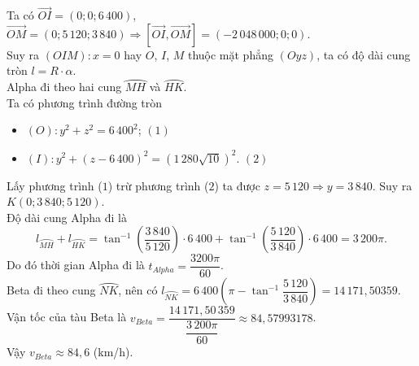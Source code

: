 \begin{ex}
{\begin{center}
\begin{tikzpicture}[>=stealth,line join=round,line cap=round,font=\footnotesize,scale=1]
			\end{tikzpicture}
		\end{center}
		Ta có $\overrightarrow{OI}=(0;0;6\,400)$, $\overrightarrow{OM}=(0;5\,120;3\,840)\Rightarrow \left[\overrightarrow{OI},\overrightarrow{OM}\right]=(-2\,048\,000;0;0)$.\\
		Suy ra $(OIM)\colon x=0$ hay $O$, $I$, $M$ thuộc mặt phẳng $(Oyz)$, ta có độ dài cung tròn $l=R\cdot\alpha $.\\
		Alpha đi theo hai cung $\wideparen{MH}$ và $\wideparen{HK}$. \\
		Ta có phương trình đường tròn 
		\begin{itemize}
			\item $(O)\colon y^2 +z^2 =6\,400^2$; \hfill$(1)$
			\item $(I)\colon y^2 +(z-6\,400)^2 =\left(1\,280\sqrt{10}\right)^2$. \hfill$(2)$
		\end{itemize}
		Lấy phương trình ($1$) trừ phương trình ($2$) ta được $z=5\,120\Rightarrow y=3\,840$. Suy ra $K(0;3\,840;5\,120)$.\\
		Độ dài cung Alpha đi là 
		\[l_{\wideparen{MH}} +l_{\wideparen{HK}} =\tan ^{-1} \left( \dfrac{3\,840}{5\,120} \right)\cdot 6\,400+\tan ^{-1} \left( \dfrac{5\,120}{3\,840} \right)\cdot 6\,400=3\,200\pi.\]
		Do đó thời gian Alpha đi là $t_{Alpha} =\dfrac{3200\pi}{60} $.\\
		Beta đi theo cung $\wideparen{NK}$, nên có $l_{\wideparen{NK}} =6\,400\left(\pi -\tan ^{-1} \dfrac{5\,120}{3\,840}\right) =14\,171{,}50359$.\\
		Vận tốc của tàu Beta là $v_{Beta} =\dfrac{14\,171{,}50\,359}{\dfrac{3\,200\pi}{60}} \approx 84{,}57993178$.\\
		Vậy $v_{Beta} \approx 84{,}6$ (km/h).
	}
\end{ex}